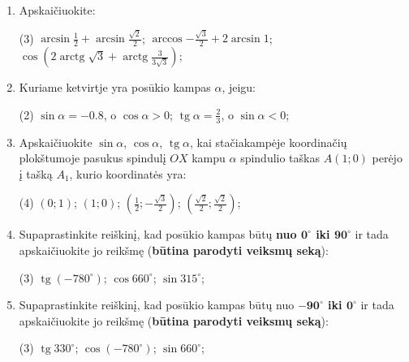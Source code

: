 \documentclass[a4paper]{article}
\DeclareMathOperator{\tg}{tg}
\DeclareMathOperator{\arctg}{arctg}
\begin{document}
\begin{enumerate}
      \item Apskaičiuokite:

            \begin{tasks}[item-format={\normalfont}, after-item-skip=4mm](3)
                  \task $\arcsin{\frac{1}{2}} + \arcsin{\frac{\sqrt{2}}{2}} $;
                  \task $\arccos{-\frac{\sqrt{3}}{2}} + 2\arcsin{1} $;
                  \task $\cos({2\arctg{\sqrt{3}} +
                              \arctg{\frac{3}{3\sqrt{3}}}})  $;

            \end{tasks}

      \item Kuriame ketvirtje yra posūkio kampas $\alpha$, jeigu:
            \begin{tasks}[item-format={\normalfont}, after-item-skip=4mm](2)
                  \task $\sin \alpha = -0.8$, o $\cos \alpha > 0$;
                  \task $\tg \alpha = \frac{2}{3}$, o $\sin \alpha < 0$;
            \end{tasks}
      \item Apskaičiuokite $\sin \alpha$, $\cos \alpha$, $\tg \alpha$, kai
            stačiakampėje koordinačių plokštumoje pasukus spindulį $OX$ kampu
            $\alpha$ spindulio taškas $A(1; 0)$ perėjo į tašką $A_{1}$, kurio
            koordinatės
            yra:
            \begin{tasks}[item-format={\normalfont}, after-item-skip=4mm](4)
                  \task $(0; 1)$;
                  \task $(1; 0)$;
                  \task $(\frac{1}{2}; -\frac{\sqrt{3}}{2})$;
                  \task $(\frac{\sqrt{2}}{2}; \frac{\sqrt{2}}{2})$;
            \end{tasks}

      \item Supaprastinkite reiškinį, kad posūkio kampas būtų \textbf{nuo
                  $\boldsymbol{0^\circ}$
                  iki $\boldsymbol{90^\circ}$} ir tada apskaičiuokite jo
            reikšmę
            (\textbf{būtina parodyti veiksmų seką}):
            \begin{tasks}[item-format={\normalfont},
                        after-item-skip=4mm](3)
                  \task $\tg (-780^\circ)$;
                  \task $\cos 660^\circ$;
                  \task $\sin 315^\circ$;
            \end{tasks}

      \item Supaprastinkite reiškinį, kad posūkio kampas būtų nuo
            \textbf{$\boldsymbol{-90^\circ}$
                  iki  $\boldsymbol{0^\circ}$} ir tada apskaičiuokite jo
            reikšmę
            (\textbf{būtina parodyti veiksmų seką}):
            \begin{tasks}[item-format={\normalfont},
                        after-item-skip=4mm](3)
                  \task $\tg 330^\circ$;
                  \task $\cos (-780^\circ)$;
                  \task $\sin 660^\circ$;
            \end{tasks}


\end{enumerate}
\end{document}
